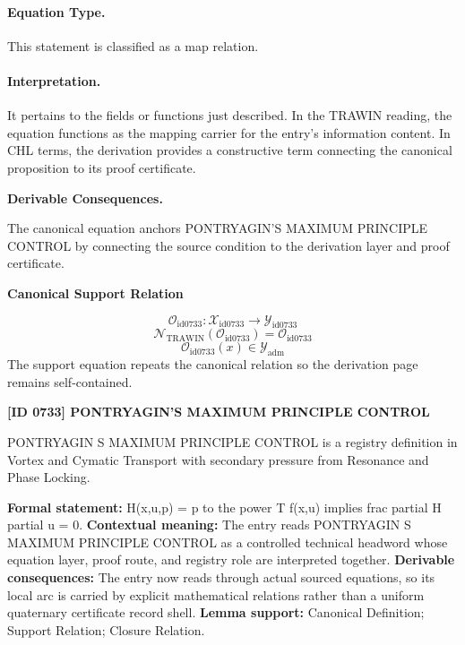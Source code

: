 \paragraph{Equation Type.}
This statement is classified as a map relation.

\paragraph{Interpretation.}
It pertains to the fields or functions just described. In the TRAWIN reading, the equation functions as the mapping carrier for the entry’s information content. In CHL terms, the derivation provides a constructive term connecting the canonical proposition to its proof certificate.

\par\vspace{0.35em}
\noindent\textbf{Derivable Consequences.}\quad
\begingroup
\footnotesize
\raggedright
The canonical equation anchors PONTRYAGIN'S MAXIMUM PRINCIPLE CONTROL by connecting the source condition to the derivation layer and proof certificate.
\par\endgroup

\noindent\textbf{Canonical Support Relation}\par
\[
\mathcal{O}_{\mathrm{id0733}}:\mathcal{X}_{\mathrm{id0733}}\longrightarrow\mathcal{Y}_{\mathrm{id0733}}
\]
\[
\mathcal{N}_{\mathrm{TRAWIN}}(\mathcal{O}_{\mathrm{id0733}})=\mathcal{O}_{\mathrm{id0733}}
\]
\[
\mathcal{O}_{\mathrm{id0733}}(x)\in\mathcal{Y}_{\mathrm{adm}}
\]
\noindent The support equation repeats the canonical relation so the derivation page remains self-contained.\par

\clearpage
\noindent\textbf{[ID 0733] PONTRYAGIN'S MAXIMUM PRINCIPLE CONTROL}\par
\vspace{0.35em}
\begingroup\small
{}
PONTRYAGIN S MAXIMUM PRINCIPLE CONTROL is a registry definition in Vortex and Cymatic Transport with secondary pressure from Resonance and Phase Locking.

\begingroup\footnotesize\setlength{\emergencystretch}{3em}\sloppy
\textbf{Formal statement:} H(x,u,p) = p to the power T f(x,u) implies frac partial H partial u = 0. \textbf{Contextual meaning:} The entry reads PONTRYAGIN S MAXIMUM PRINCIPLE CONTROL as a controlled technical headword whose equation layer, proof route, and registry role are interpreted together. \textbf{Derivable consequences:} The entry now reads through actual sourced equations, so its local arc is carried by explicit mathematical relations rather than a uniform quaternary certificate record shell. \textbf{Lemma support:} Canonical Definition; Support Relation; Closure Relation.\par
\endgroup

